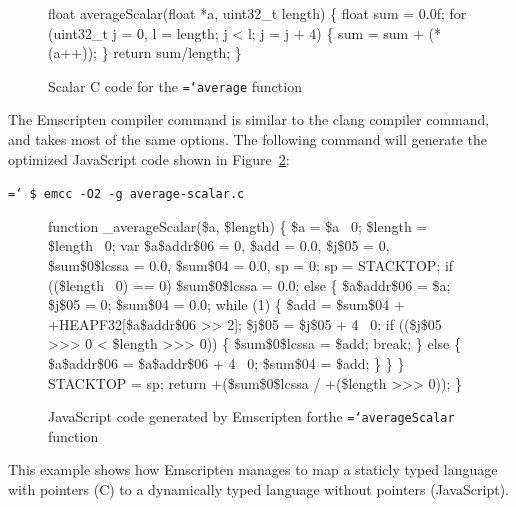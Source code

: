 \documentclass[preprint]{sigplanconf}
\newcommand{\ttt}[1]{{\texttt{\hyphenchar\font=`\-\relax #1}}}%
\begin{document}
\begin{figure}
\begin{small}
\begin{program}[style=tt, number=true]
fl\tab{}oat averageScalar(float *a, uint32\_t length) \{
  float  sum = 0.0f;
  fo\tab{}r (uint32\_t j = 0, l = length; j < l; j = j + 4) \{
    sum = sum + (*(a++));\untab{}
  \}
  return sum/length;\untab{}
\}
\end{program}
\end{small}
\caption{Scalar C code for the \ttt{average} function}
\label{fig:average-scalar}
\end{figure}

The Emscripten compiler command is similar to the clang compiler command, and
takes most of the same options.  The following command will generate the optimized
JavaScript code shown in Figure~\ref{fig:average-scalar-code}:

\smallskip
\ttt{  \$ emcc -O2 -g average-scalar.c}
\smallskip

\begin{figure}
\begin{small}
\begin{program}[style=tt, number=true]
fu\tab{}nction \_averageScalar(\$a, \$length) \{
 \$a = \$a \textbar\ 0;
 \$length = \$length \textbar\ 0;
 var \tab{}\$a\$addr\$06 = 0, \$add = 0.0, \$j\$05 = 0,
     \$sum\$0\$lcssa = 0.0, \$sum\$04 = 0.0, sp = 0;\untab{}
 sp = STACKTOP;
 if\tab{} ((\$length \textbar\ 0) == 0)
   \$sum\$0\$lcssa = 0.0;\untab{}
 el\tab{}se \{
  \$a\$addr\$06 = \$a;
  \$j\$05 = 0;
  \$sum\$04 = 0.0;
  wh\tab{}ile (1) \{
   \$add = \$sum\$04 + +HEAPF32[\$a\$addr\$06 >> 2];
   \$j\$05 = \$j\$05 + 4 \textbar\ 0;
   if\tab{} (\!(\$j\$05 >>> 0 < \$length >>> 0)) \{
    \$sum\$0\$lcssa = \$add;
    break;\untab{}
   \}\tab{} else \{
    \$a\$addr\$06 = \$a\$addr\$06 + 4 \textbar\ 0;
    \$sum\$04 = \$add;\untab{}
   \}\untab{}
  \}\untab{}
 \}
 STACKTOP = sp;
 return +(\$sum\$0\$lcssa / +(\$length >>> 0));\untab{}
\}
\end{program}
\end{small}
\caption{JavaScript code generated by Emscripten for\newline the \ttt{averageScalar} function}
\label{fig:average-scalar-code}
\end{figure}

This example shows how Emscripten manages to map a staticly typed language with pointers (C)
to a dynamically typed language without pointers (JavaScript).
\end{document}
